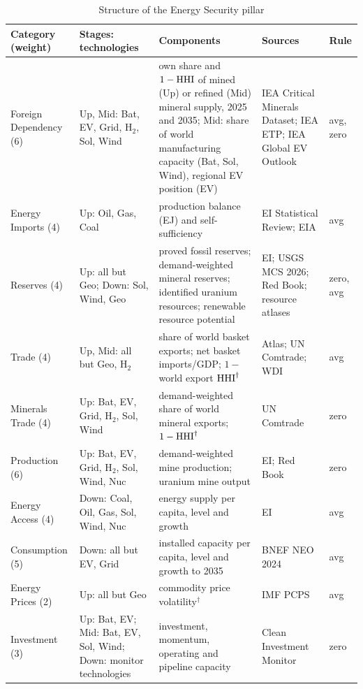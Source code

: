\begin{table}[tbp]
\centering
\begin{threeparttable}
\caption{Structure of the Energy Security pillar}
\label{tab:es_structure}
\scriptsize
\setlength{\tabcolsep}{3pt}
\begin{tabularx}{\textwidth}{@{}>{\raggedright\arraybackslash}p{2.1cm}
  >{\raggedright\arraybackslash}p{2.6cm}
  >{\raggedright\arraybackslash}X
  >{\raggedright\arraybackslash}p{2.6cm}
  >{\raggedright\arraybackslash}p{0.9cm}@{}}
\toprule
Category (weight) & Stages: technologies & Components & Sources & Rule\\
\midrule
Foreign Dependency (6) & Up, Mid: Bat, EV, Grid, H$_2$, Sol, Wind &
own share and $1-\mathrm{HHI}$ of mined (Up) or refined (Mid) mineral supply, 2025 and 2035; Mid: share
of world manufacturing capacity (Bat, Sol, Wind), regional EV position (EV) &
IEA Critical Minerals Dataset; IEA ETP; IEA Global EV Outlook & avg, zero\\
Energy Imports (4) & Up: Oil, Gas, Coal & production balance (EJ) and self-sufficiency &
EI Statistical Review; EIA & avg\\
Reserves (4) & Up: all but Geo; Down: Sol, Wind, Geo &
proved fossil reserves; demand-weighted mineral reserves; identified uranium resources;
renewable resource potential &
EI; USGS MCS 2026; Red Book; resource atlases & zero, avg\\
Trade (4) & Up, Mid: all but Geo, H$_2$ &
share of world basket exports; net basket imports/GDP; $1-$ world export
$\mathrm{HHI}^{\dagger}$ & Atlas; UN Comtrade; WDI & avg\\
Minerals Trade (4) & Up: Bat, EV, Grid, H$_2$, Sol, Wind &
demand-weighted share of world mineral exports; $1-\mathrm{HHI}^{\dagger}$ & UN Comtrade & zero\\
Production (6) & Up: Bat, EV, Grid, H$_2$, Sol, Wind, Nuc & demand-weighted mine production;
uranium mine output & EI; Red Book & zero\\
Energy Access (4) & Down: Coal, Oil, Gas, Sol, Wind, Nuc & energy supply per capita, level and
growth & EI & avg\\
Consumption (5) & Down: all but EV, Grid & installed capacity per capita, level and growth to 2035
& BNEF NEO 2024 & avg\\
Energy Prices (2) & Up: all but Geo & commodity price volatility$^{\dagger}$ & IMF PCPS & avg\\
Investment (3) & Up: Bat, EV; Mid: Bat, EV, Sol, Wind; Down: monitor technologies & investment,
momentum, operating and pipeline capacity & Clean Investment Monitor & zero\\

\end{tabularx}
\end{threeparttable}
\end{table}
